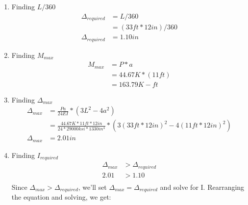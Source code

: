 \documentclass{report} %
\begin{document}
\begin{enumerate}
    \item Finding $L/360$
        \begin{equation*}
            \begin{aligned}
                \Delta _{required} &= L/360 \\
                            &= (33ft * 12in)/360\\
                \Delta _{required} &= 1.10in    
            \end{aligned}
        \end{equation*}
    \item Finding $M_{max}$
        \begin{equation*}
            \begin{aligned}
                M_{max} &= P * a \\
                        &= 44.67K * (11ft) \\  %
                        &= 163.79 K-ft
            \end{aligned}
        \end{equation*} 
    \item Finding $\Delta _{max}$
        \begin{equation*}
            \begin{aligned}
                \Delta _{max} &= \frac{Pa}{24EI} * (3L^2-4a^2)\\ %
                        &= \frac{44.67K * 11ft * 12in}{24 * 29000ksi * 1330in^4} * (3(33ft * 12in)^2-4(11ft * 12in)^2) \\
                \Delta _{max} &= 2.01in    
            \end{aligned}
        \end{equation*}
    \item Finding $I_{required}$
        \begin{equation*}
            \begin{aligned}
                \Delta _{max} &> \Delta _{required} \\
                2.01 &> 1.10 \\
            \end{aligned}
        \end{equation*}
        Since $\Delta _{max} > \Delta _{required}$, we'll set $\Delta _{max} = \Delta _{required}$ and solve for I. Rearranging the equation and solving, we get:

\end{enumerate}
\end{document}
